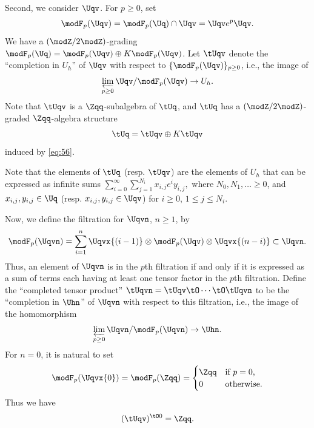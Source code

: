 \documentclass{amsart}
\numberwithin{equation}{section}
\numberwithin{figure}{section}
\theoremstyle{plain}
\theoremstyle{definition}
\theoremstyle{remark}
\begin{document}
Second, we consider $\Uqv$.  For $p\ge 0$, set
\begin{equation*}
  \modF _p(\Uqv)=\modF _p(\Uq)\cap \Uqv=\Uqv e^p\Uqv.
\end{equation*}
We have a $(\modZ /2\modZ )$-grading $\modF _p(\Uq)=\modF _p(\Uqv)\oplus K\modF _p(\Uqv)$.
Let $\tUqv$ denote the ``completion in $U_h$'' of $\Uqv$ with respect
to $\{\modF _p(\Uqv)\}_{p\ge 0}$, i.e., the image of
\begin{equation*}
  \varprojlim_{p\ge 0}\Uqv/\modF _p(\Uqv)\rightarrow U_h.
\end{equation*}
Note that $\tUqv$ is a $\Zqq$-subalgebra of $\tUq$, and $\tUq$ has a
$(\modZ /2\modZ )$-graded $\Zqq$-algebra structure
\begin{equation*}
  \tUq=\tUqv\oplus K\tUqv
\end{equation*}
induced by \eqref{eq:56}.

Note that the elements of $\tUq$ (resp. $\tUqv$) are the elements of
$U_h$ that can be expressed as infinite sums
\begin{math}
  \sum_{i=0}^\infty \sum_{j=1}^{N_i} x_{i,j}e^iy_{i,j},
\end{math}
where $N_0,N_1,\ldots\ge 0$, and $x_{i,j},y_{i,j}\in \Uq$
(resp. $x_{i,j},y_{i,j}\in \Uqv$) for $i\ge 0$, $1\le j\le N_i$.

Now, we define the filtration for $\Uqvn$, $n\ge 1$, by
\begin{equation*}
  \modF _p(\Uqvn)
  =\sum_{i=1}^n\Uqvx{(i-1)}\otimes \modF _p(\Uqv)\otimes \Uqvx{(n-i)}\subset \Uqvn.
\end{equation*}
Thus, an element of $\Uqvn$ is in the $p$th filtration if and only if
it is expressed as a sum of terms each having at least one tensor
factor in the $p$th filtration.  Define the ``completed tensor
product'' $\tUqvn= \tUqv\tO\cdots\tO\tUqvn$ to be the ``completion in
$\Uhn$'' of $\Uqvn$ with respect to this filtration, i.e., the image
of the homomorphism
\begin{equation*}
  \varprojlim_{p\ge 0}\Uqvn/\modF _p(\Uqvn)\rightarrow \Uhn.
\end{equation*}
For $n=0$, it is natural to set
\begin{equation*}
  \modF _p(\Uqvx{0})=\modF _p(\Zqq)=
  \begin{cases}
    \Zqq&\text{if $p=0$,}\\
    0&\text{otherwise.}
  \end{cases}
\end{equation*}
Thus we have
\begin{equation*}
  (\tUqv)^{\tO 0} = \Zqq.
\end{equation*}
\end{document}
